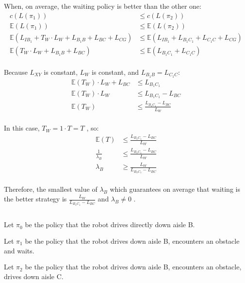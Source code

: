 \documentclass{article}
\begin{document}
When, on average, the waiting policy is better than the other one: 
\begin{align*}
c(L(\pi_{1})) &\leq c(L(\pi_{2}))  \\
\mathbb{E}(L(\pi_{1})) &\leq \mathbb{E}(L(\pi_{2}))  \\
\mathbb{E}(L_{IB_{1}} + T_{W} \cdot L_{W} + L_{B_{1}B} + L_{BC} + L_{CG}) &\leq \mathbb{E}(L_{IB_{1}} +  L_{B_{1}C_{1}} + L_{C_{1}C} + L_{CG})  \\
\mathbb{E}(T_{W} \cdot L_{W} + L_{B_{1}B} + L_{BC}) &\leq \mathbb{E}(L_{B_{1}C_{1}} + L_{C_{1}C})  \\
\end{align*}

Because $L_{XY}$ is constant, $L_{W}$ is constant, and $L_{B_{1}B} = L_{C_{1}C}$:
\begin{align*}
\mathbb{E}(T_{W}) \cdot L_{W} + L_{BC} &\leq L_{B_{1}C_{1}}  \\
\mathbb{E}(T_{W}) \cdot L_{W} &\leq L_{B_{1}C_{1}} -  L_{BC}   \\
\mathbb{E}(T_{W}) &\leq \frac{L_{B_{1}C_{1}} -  L_{BC}}{L_{W} }   \\
\end{align*}

In this case, $T_{W} = 1 \cdot T = T$ , so:
\begin{align*}
\mathbb{E}(T) &\leq \frac{L_{B_{1}C_{1}} -  L_{BC}}{L_{W} }   \\
\frac{1}{\lambda_{B}} &\leq \frac{L_{B_{1}C_{1}} -  L_{BC}}{L_{W} }  \\
\lambda_{B} &\geq \frac{L_{W}} {L_{B_{1}C_{1}} -  L_{BC}} \\
\end{align*}

Therefore, the smallest value of $\lambda_{B}$ which guarantees on average that waiting is the better strategy is $\frac{L_{W}} {L_{B_{1}C_{1}} -  L_{BC}}$ and $\lambda_{B} \ne 0$ .

\subsection{}

Let $\pi_{0}$ be the policy that the robot drives directly down aisle B.

Let $\pi_{1}$ be the policy that the robot drives down aisle B, encounters an obstacle and waits.

Let $\pi_{2}$ be the policy that the robot drives down aisle B, encounters an obstacle, drives down aisle C.
\end{document}
